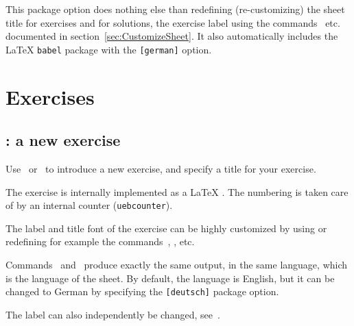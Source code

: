 \documentclass[11pt,a4paper]{article}
\begin{document}
\begin{pkgtip}
  This package option does nothing else than redefining (re-customizing) the sheet title
  for exercises and for solutions, the exercise label using the
  commands~ etc. documented in
  section~\ref{sec:CustomizeSheet}. It also automatically includes the \LaTeX{}
  \texttt{babel} package with the \texttt{[german]} option.
\end{pkgtip}




\section{Exercises}

\subsection{: a new exercise}

Use~ or~ to introduce a new exercise, and specify a
title for your exercise.


The exercise is internally implemented as a \LaTeX{} . The numbering is
taken care of by an internal counter (\texttt{uebcounter}).

The label and title font of the exercise can be highly customized by using or redefining
for example the commands~, ,
 etc.


\begin{pkgnotice}
  Commands~ and~ produce exactly the same output, in
  the same language, which is the language of the sheet. By default, the language is
  English, but it can be changed to German by specifying the \texttt{[deutsch]} package
  option.

  The label can also independently be changed, see~.
\end{pkgnotice}
\end{document}
